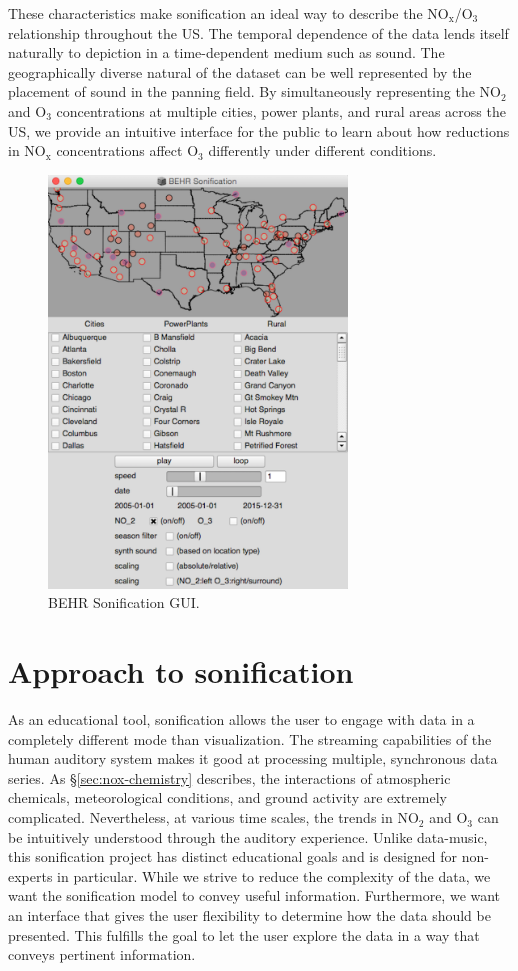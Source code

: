 \documentclass[a4paper,10pt,oneside]{article}
\newcommand{\ce}[1]{$\mathrm{#1}$}
\begin{document}
\begin{sloppy}
These characteristics make sonification an ideal way to describe the \ce{NO_x}/\ce{O_3} relationship throughout the US. The temporal dependence of the data lends itself naturally to depiction in a time-dependent medium such as sound. The geographically diverse natural of the dataset can be well represented by the placement of sound in the panning field. By simultaneously representing the \ce{NO_2} and \ce{O_3} concentrations at multiple cities, power plants, and rural areas across the US, we provide an intuitive interface for the public to learn about how reductions in \ce{NO_x} concentrations affect \ce{O_3} differently under different conditions.
	
\begin{figure}[t]
\centering
\includegraphics[width=300px]{figs/gui.png}
\caption{BEHR Sonification GUI.}
\label{fig:gui}
\end{figure}

\section{Approach to sonification}
As an educational tool, sonification allows the user to engage with data in a completely different mode than visualization. The streaming capabilities of the human auditory system makes it good at processing multiple, synchronous data series. As \S \ref{sec:nox-chemistry} describes, the interactions of atmospheric chemicals, meteorological conditions, and ground activity are extremely complicated. Nevertheless, at various time scales, the trends in \ce{NO_2} and \ce{O_3} can be intuitively understood through the auditory experience. Unlike data-music, this sonification project has distinct educational goals and is designed for non-experts in particular. While we strive to reduce the complexity of the data, we want the sonification model to convey useful information.  Furthermore, we want an interface that gives the user flexibility to determine how the data should be presented.  This fulfills the goal to let the user explore the data in a way that conveys pertinent information.  


\end{sloppy}
\end{document}
